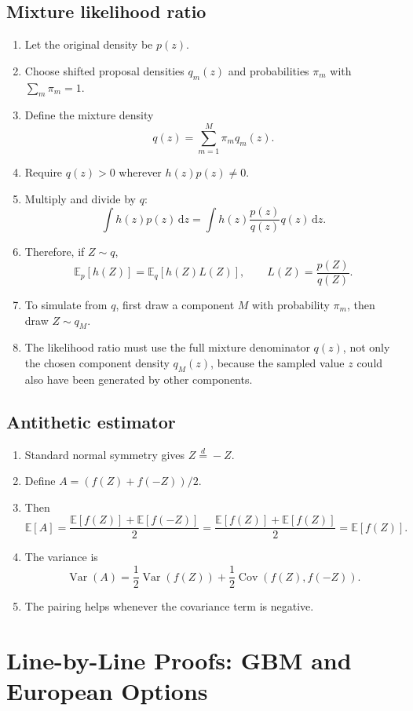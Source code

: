 \documentclass[11pt,oneside]{book}
\theoremstyle{definition}
\newenvironment{proofsteps}
{\begin{enumerate}[label=\textbf{Line \arabic*.}, itemsep=0.35em]}
{\end{enumerate}}
\newcommand{\E}{\mathbb{E}}
\newcommand{\Var}{\operatorname{Var}}
\newcommand{\Cov}{\operatorname{Cov}}
\newcommand{\dd}{\,\mathrm{d}}
\begin{document}
\section{Mixture likelihood ratio}
\begin{proofsteps}
\item Let the original density be \(p(z)\).
\item Choose shifted proposal densities \(q_m(z)\) and probabilities \(\pi_m\) with \(\sum_m\pi_m=1\).
\item Define the mixture density
\[
  q(z)=\sum_{m=1}^M\pi_m q_m(z).
\]
\item Require \(q(z)>0\) wherever \(h(z)p(z)\neq0\).
\item Multiply and divide by \(q\):
\[
  \int h(z)p(z)\dd z
  =
  \int h(z)\frac{p(z)}{q(z)}q(z)\dd z.
\]
\item Therefore, if \(Z\sim q\),
\[
  \E_p[h(Z)]
  =
  \E_q[h(Z)L(Z)],
  \qquad
  L(Z)=\frac{p(Z)}{q(Z)}.
\]
\item To simulate from \(q\), first draw a component \(M\) with probability \(\pi_m\), then draw \(Z\sim q_M\).
\item The likelihood ratio must use the full mixture denominator \(q(z)\), not only the chosen component density \(q_M(z)\), because the sampled value \(z\) could also have been generated by other components.
\end{proofsteps}

\section{Antithetic estimator}
\begin{proofsteps}
\item Standard normal symmetry gives \(Z\stackrel d=-Z\).
\item Define \(A=(f(Z)+f(-Z))/2\).
\item Then
\[
\E[A]=\frac{\E[f(Z)]+\E[f(-Z)]}{2}
=\frac{\E[f(Z)]+\E[f(Z)]}{2}
=\E[f(Z)].
\]
\item The variance is
\[
\Var(A)=\frac12\Var(f(Z))+\frac12\Cov(f(Z),f(-Z)).
\]
\item The pairing helps whenever the covariance term is negative.
\end{proofsteps}

\chapter{Line-by-Line Proofs: GBM and European Options}
\end{document}
